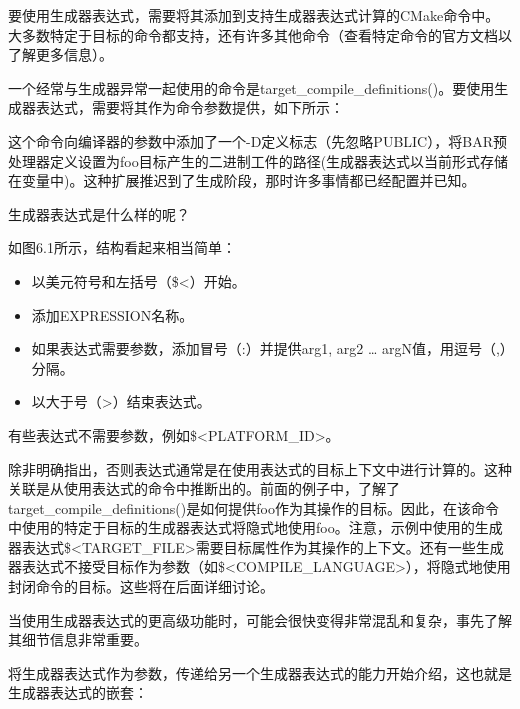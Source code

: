 
要使用生成器表达式，需要将其添加到支持生成器表达式计算的CMake命令中。大多数特定于目标的命令都支持，还有许多其他命令（查看特定命令的官方文档以了解更多信息）。

一个经常与生成器异常一起使用的命令是target\_compile\_definitions()。要使用生成器表达式，需要将其作为命令参数提供，如下所示：


这个命令向编译器的参数中添加了一个-D定义标志（先忽略PUBLIC），将BAR预处理器定义设置为foo目标产生的二进制工件的路径(生成器表达式以当前形式存储在变量中)。这种扩展推迟到了生成阶段，那时许多事情都已经配置并已知。

生成器表达式是什么样的呢？


如图6.1所示，结构看起来相当简单：

\begin{itemize}
\item
以美元符号和左括号（\$<）开始。

\item
添加EXPRESSION名称。

\item
如果表达式需要参数，添加冒号（:）并提供arg1, arg2 … argN值，用逗号（,）分隔。

\item
以大于号（>）结束表达式。
\end{itemize}

有些表达式不需要参数，例如\$<PLATFORM\_ID>。

除非明确指出，否则表达式通常是在使用表达式的目标上下文中进行计算的。这种关联是从使用表达式的命令中推断出的。前面的例子中，了解了target\_compile\_definitions()是如何提供foo作为其操作的目标。因此，在该命令中使用的特定于目标的生成器表达式将隐式地使用foo。注意，示例中使用的生成器表达式\$<TARGET\_FILE>需要目标属性作为其操作的上下文。还有一些生成器表达式不接受目标作为参数（如\$<COMPILE\_LANGUAGE>），将隐式地使用封闭命令的目标。这些将在后面详细讨论。

当使用生成器表达式的更高级功能时，可能会很快变得非常混乱和复杂，事先了解其细节信息非常重要。


将生成器表达式作为参数，传递给另一个生成器表达式的能力开始介绍，这也就是生成器表达式的嵌套：

